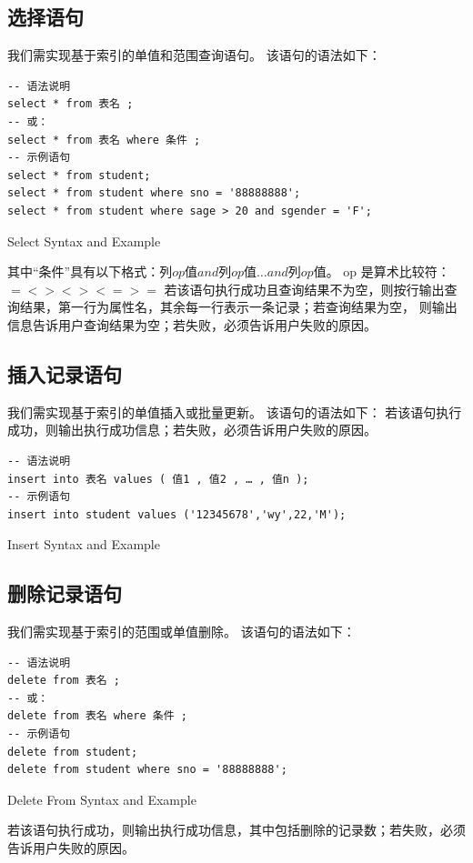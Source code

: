 \documentclass[UTF8]{ctexrep} %
\newenvironment{longlisting}{\captionsetup{type=listing}}{}
\begin{document}
\subsection{选择语句}
我们需实现基于索引的单值和范围查询语句。
该语句的语法如下：
\begin{longlisting}
    \begin{verbatim}
-- 语法说明
select * from 表名 ;
-- 或：
select * from 表名 where 条件 ;
-- 示例语句
select * from student;
select * from student where sno = '88888888';
select * from student where sage > 20 and sgender = 'F';
    \end{verbatim}
    \caption{Select Syntax and Example}
    \label{lst:select_requirements}
\end{longlisting}
其中“条件”具有以下格式：$列 op 值 and 列 op 值 … and 列 op 值$。
op 是算术比较符：$= <> < > <= >=$
若该语句执行成功且查询结果不为空，则按行输出查询结果，第一行为属性名，其余每一行表示一条记录；若查询结果为空，
则输出信息告诉用户查询结果为空；若失败，必须告诉用户失败的原因。

\subsection{插入记录语句}
我们需实现基于索引的单值插入或批量更新。
该语句的语法如下：
若该语句执行成功，则输出执行成功信息；若失败，必须告诉用户失败的原因。
\begin{longlisting}
    \begin{verbatim}
-- 语法说明
insert into 表名 values ( 值1 , 值2 , … , 值n );
-- 示例语句
insert into student values ('12345678','wy',22,'M');
    \end{verbatim}
    \caption{Insert Syntax and Example}
    \label{lst:insert_requirements}
\end{longlisting}

\subsection{删除记录语句}
我们需实现基于索引的范围或单值删除。
该语句的语法如下：
\begin{longlisting}
    \begin{verbatim}
-- 语法说明
delete from 表名 ;
-- 或：
delete from 表名 where 条件 ;
-- 示例语句
delete from student;
delete from student where sno = '88888888';
    \end{verbatim}
    \caption{Delete From Syntax and Example}
    \label{lst:delete_from_requirements}
\end{longlisting}
若该语句执行成功，则输出执行成功信息，其中包括删除的记录数；若失败，必须告诉用户失败的原因。
\end{document}
